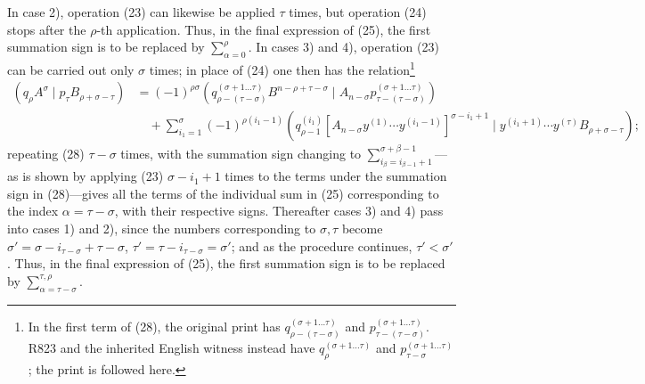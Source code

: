 \documentclass[10pt]{article}
\newcommand{\pair}[2]{(#1\mid #2)}
\begin{document}
In case 2), operation (23) can likewise be applied $\tau$ times, but operation (24) stops after the $\rho$-th application. Thus, in the final expression of (25), the first summation sign is to be replaced by $\sum_{\alpha=0}^{\rho}$. In cases 3) and 4), operation (23) can be carried out only $\sigma$ times; in place of (24) one then has the relation\footnote{In the first term of (28), the original print has $q_{\rho-(\tau-\sigma)}^{(\sigma+1\ldots\tau)}$ and $p_{\tau-(\tau-\sigma)}^{(\sigma+1\ldots\tau)}$. R823 and the inherited English witness instead have $q_\rho^{(\sigma+1\ldots\tau)}$ and $p_{\tau-\sigma}^{(\sigma+1\ldots\tau)}$; the print is followed here.}
\begin{equation}
\begin{aligned}
\pair{q_\rho A^\sigma}{p_\tau B_{\rho+\sigma-\tau}}
&=(-1)^{\rho\sigma}
 \pair{q_{\rho-(\tau-\sigma)}^{(\sigma+1\ldots\tau)}B^{n-\rho+\tau-\sigma}}{A_{n-\sigma}p_{\tau-(\tau-\sigma)}^{(\sigma+1\ldots\tau)}}\\
&\quad+\sum_{i_1=1}^{\sigma}(-1)^{\rho(i_1-1)}
 \pair{q_{\rho-1}^{(i_1)}[A_{n-\sigma}y^{(1)}\cdots y^{(i_1-1)}]^{\sigma-i_1+1}}
 {y^{(i_1+1)}\cdots y^{(\tau)}B_{\rho+\sigma-\tau}};
\end{aligned}
\tag{28}
\end{equation}
repeating (28) $\tau-\sigma$ times, with the summation sign changing to $\sum_{i_\beta=i_{\beta-1}+1}^{\sigma+\beta-1}$---as is shown by applying (23) $\sigma-i_1+1$ times to the terms under the summation sign in (28)---gives all the terms of the individual sum in (25) corresponding to the index $\alpha=\tau-\sigma$, with their respective signs. Thereafter cases 3) and 4) pass into cases 1) and 2), since the numbers corresponding to $\sigma,\tau$ become
$\sigma'=\sigma-i_{\tau-\sigma}+\tau-\sigma$, $\tau'=\tau-i_{\tau-\sigma}=\sigma'$; and as the procedure continues, $\tau'<\sigma'$. Thus, in the final expression of (25), the first summation sign is to be replaced by $\sum_{\alpha=\tau-\sigma}^{\tau,\rho}$.
\end{document}
